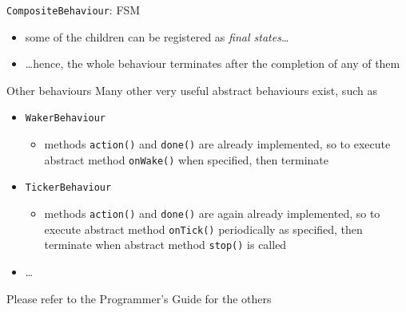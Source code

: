 \documentclass{beamer}\mode<presentation>{\usetheme{AMSCesenaPurpleAndGold}}
\begin{document}
\begin{frame}[c,allowframebreaks]
\begin{block}{\texttt{CompositeBehaviour}: FSM}
\begin{itemize}
\begin{itemize}
\begin{itemize}
                \end{itemize}
                \item some of the children can be registered as \emph{final states}\ldots
                \item \ldots hence, the whole behaviour terminates after the completion of any of them
            \end{itemize}
        \end{itemize}
    \end{block}
    \begin{block}{Other behaviours}
        Many other very useful abstract behaviours exist, such as
        \begin{itemize}
            \item \texttt{WakerBehaviour}
            \begin{itemize}
                \item methods \texttt{action()} and \texttt{done()} are already implemented, so to execute abstract method \texttt{onWake()} when specified, then terminate
            \end{itemize}
            \item \texttt{TickerBehaviour}
            \begin{itemize}
                \item methods \texttt{action()} and \texttt{done()} are again already implemented, so to execute abstract method \texttt{onTick()} periodically as specified, then terminate when abstract method \texttt{stop()} is called
            \end{itemize}
            \item \ldots
        \end{itemize}
        Please refer to the \jade{} Programmer's Guide for the others 
    \end{block}
\end{frame}
\end{document}

